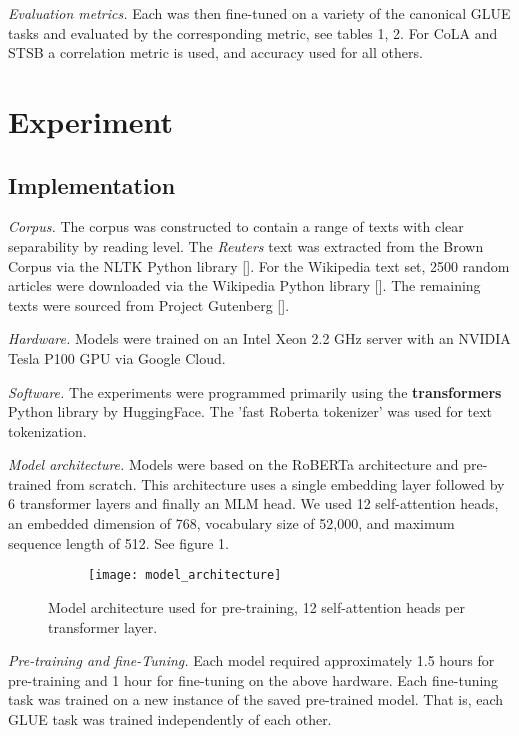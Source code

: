 \documentclass{article}
\begin{document}
\emph{Evaluation metrics.} Each was then fine-tuned on a variety of the canonical GLUE tasks and evaluated by the corresponding metric, see tables 1, 2. For CoLA and STSB a correlation metric is used, and accuracy used for all others.



\section{Experiment}

\subsection{Implementation}

\emph{Corpus.} The corpus was constructed to contain a range of texts with clear separability by reading level. The \emph{Reuters} text was extracted from the Brown Corpus via the NLTK Python library []. For the Wikipedia text set, 2500 random articles were downloaded via the Wikipedia Python library []. The remaining texts were sourced from Project Gutenberg [].

\emph{Hardware.} Models were trained on an Intel Xeon 2.2 GHz server with an NVIDIA Tesla P100 GPU via Google Cloud.

\emph{Software.} The experiments were programmed primarily using the \textbf{transformers} Python library by HuggingFace. The 'fast Roberta tokenizer' was used for text tokenization.

\emph{Model architecture.} Models were based on the RoBERTa architecture and pre-trained from scratch. This architecture uses a single embedding layer followed by 6 transformer layers and finally an MLM head. We used 12 self-attention heads, an embedded dimension of 768, vocabulary size of 52,000, and maximum sequence length of 512. See figure 1.

\begin{figure}
\centering
\begin{subfigure}{1\textwidth}
  \centering
  \texttt{[image: model\_architecture]}
  \label{fig:sub1}
\end{subfigure}
\caption{Model architecture used for pre-training, 12 self-attention heads per transformer layer.}
\label{fig:test}
\end{figure}

\emph{Pre-training and fine-Tuning.} Each model required approximately 1.5 hours for pre-training and 1 hour for fine-tuning on the above hardware. Each fine-tuning task was trained on a new instance of the saved pre-trained model. That is, each GLUE task was trained independently of each other.
\end{document}
